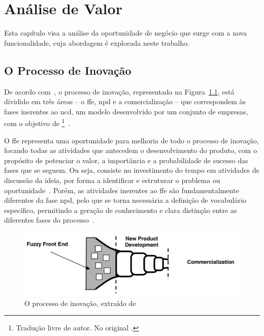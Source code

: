 \chapter{Análise de Valor}
\label{AppendixB}
Esta capítulo visa a análise da oportunidade de negócio que surge com a nova funcionalidade, cuja abordagem é explorada neste trabalho.

\section{O Processo de Inovação}
De acordo com~\textcite{ffe_effectivemethods_tools_techniques}, o processo de inovação, representado na Figura~\ref{fig:inovation_process}, está dividido em três áreas -- o \gls{ffe}, \gls{npd} e a comercialização -- que correspondem às fases inerentes ao \gls{ncd}, um modelo desenvolvido por um conjunto de empresas, com o objetivo de \footnote{Tradução livre de autor. No original .}~\parencite{providing_clarity_common_language_ffe}.

O \gls{ffe} representa uma oportunidade para melhoria de todo o processo de inovação, focando todas as atividades que antecedem o desenvolvimento do produto, com o propósito de potenciar o valor, a importância e a probabilidade de sucesso das fases que se seguem. Ou seja, consiste no investimento do tempo em atividades de discussão da ideia, por forma a identificar e estruturar o problema ou oportunidade~\parencite{ffe_effectivemethods_tools_techniques, ffe_theoretical_model}. Porém, as atividades inerentes ao \gls{ffe} são fundamentalmente diferentes da fase \gls{npd}, pelo que se torna necessária a definição de vocabulário específico, permitindo a geração de conhecimento e clara distinção entre as diferentes fases do processo~\parencite{ffe_effectivemethods_tools_techniques}.

\begin{figure}[!ht]
    \centering
    \includegraphics[width=.95\textwidth]{appendices/assets/inovation_process.jpg}
    \caption{O processo de inovação, extraído de~\textcite{ffe_effectivemethods_tools_techniques}}
    \label{fig:inovation_process}
\end{figure}

